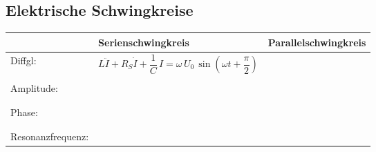 \subsection{Elektrische Schwingkreise  }
\renewcommand{\arraystretch}{1.5}
\begin{tabular}{|p{4cm}|p{7cm}|p{7cm}|}
\hline
& Serienschwingkreis & Parallelschwingkreis\\
\hline
Diffgl: &
\begin{minipage}[]{7cm}
\vspace{0.2cm}
$L\ddot{I}+R_S\dot{I}+\dfrac{1}{C}\,I=\omega\,U_0\,\sin(\omega t + \dfrac{\pi}{2})$ \qquad 
\end{minipage} &
\begin{minipage}[]{7cm}
\vspace{0.2cm}
$C\ddot{U}+\dfrac{1}{R_P}\dot{U}+\dfrac{1}{L}U=\omega\,I_0\,\sin(\omega
t+\dfrac{\pi}{2})$\\
\end{minipage}
\\
\hline
Amplitude: &
\begin{minipage}[]{7cm}
\vspace{0.1cm}
$I_0=\dfrac{\omega\,U_0}{L\sqrt{(\omega_0^{\,2}-\omega^2)^2+(2D\,\omega_0\,\omega)^2}}$\\
\end{minipage} &
\begin{minipage}[]{7cm}
\vspace{0.1cm}
$U_0=\dfrac{\omega\,I_0}{C\sqrt{(\omega_0^{\,2}-\omega^2)^2+(2D\,\omega_0\,\omega)^2}}$\\
\end{minipage}\\
\hline
Phase: &
\begin{minipage}[]{7cm}
\vspace{0.1cm}
$\varphi=\arctan \left( {\dfrac{2D\,\omega_0\,\omega}{\omega_0^{\,2}-\omega^2}}\right) -\dfrac{\pi}{2}$\\
\end{minipage}&
\begin{minipage}[]{7cm}
\vspace{0.2cm}
$\varphi=\arctan\left( {\dfrac{2D\,\omega_0\,\omega}{\omega_0^{\,2}-\omega^2}}\right) -\dfrac{\pi}{2}$\\
\end{minipage}\\
\hline
Resonanzfrequenz: &
\begin{minipage}[]{7cm}

\end{minipage}
\end{tabular}
